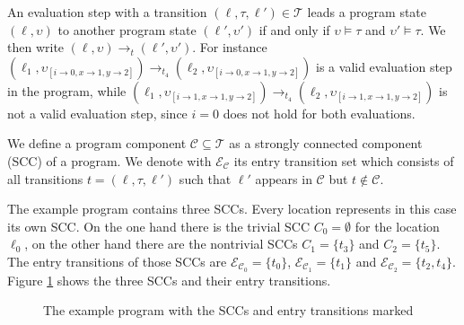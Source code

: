 An evaluation step with a transition $(\ell, \tau, \ell') \in \mathcal{T}$ leads a program state $(\ell, \upsilon)$ to another program state $(\ell', \upsilon')$ if and only if $\upsilon \models \tau$ and $\upsilon' \models \tau$. We then write $(\ell, \upsilon) \rightarrow_t (\ell', \upsilon')$.
For instance $(\ell_1,\upsilon_{[i \rightarrow 0, x \rightarrow 1, y \rightarrow 2]}) \rightarrow_{t_4} (\ell_2,\upsilon_{[i \rightarrow 0, x \rightarrow 1, y \rightarrow 2]})$ is a valid evaluation step in the program, while $(\ell_1,\upsilon_{[i \rightarrow 1, x \rightarrow 1, y \rightarrow 2]}) \rightarrow_{t_4} (\ell_2,\upsilon_{[i \rightarrow 1, x \rightarrow 1, y \rightarrow 2]})$ is not a valid evaluation step, since $i = 0$ does not hold for both evaluations.

We define a program component $\mathcal{C} \subseteq \mathcal{T}$ as a strongly connected component (SCC) of a program.
We denote with $\mathcal{E}_\mathcal{C}$ its entry transition set which consists of all transitions $t = (\ell, \tau, \ell')$ such that $\ell'$ appears in $\mathcal{C}$ but $t \notin \mathcal{C}$.

The example program contains three SCCs. Every location represents in this case its own SCC. On the one hand there is the trivial SCC $C_0 = \emptyset$ for the location $\ell_0$, on the other hand there are the nontrivial SCCs $C_1 = \lbrace t_3 \rbrace$ and $C_2 = \lbrace t_5 \rbrace$.
The entry transitions of those SCCs are $\mathcal{E}_{\mathcal{C}_0} = \lbrace t_0 \rbrace$, $\mathcal{E}_{\mathcal{C}_1} = \lbrace t_1 \rbrace$ and $\mathcal{E}_{\mathcal{C}_2} = \lbrace t_2, t_4 \rbrace$.
Figure \ref{fig:sccs} shows the three SCCs and their entry transitions.

\begin{figure}
\centering
{}
\caption{The example program with the SCCs and entry transitions marked}
\label{fig:sccs}
\end{figure}

